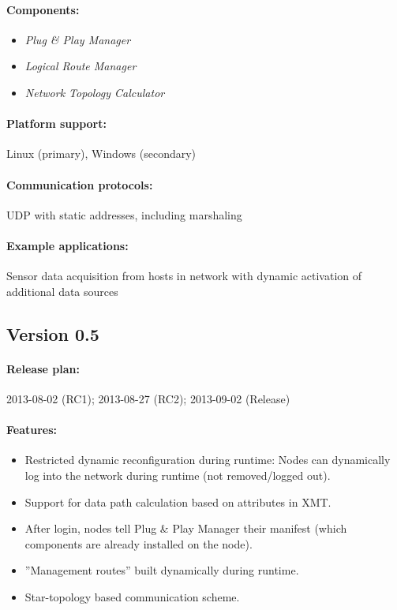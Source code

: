 \paragraph{Components:}
\begin{itemize}
	\item \emph{Plug \& Play Manager}
	\item \emph{Logical Route Manager}
	\item \emph{Network Topology Calculator}
\end{itemize}

\paragraph{Platform support:} Linux (primary), Windows (secondary)
\paragraph{Communication protocols:} UDP with static addresses, including marshaling
\paragraph{Example applications:} Sensor data acquisition from hosts in network with dynamic activation of additional data sources



\subsection{Version 0.5}

\paragraph{Release plan:} 2013-08-02 (RC1); 2013-08-27 (RC2); 2013-09-02 (Release)

\paragraph{Features:}
\begin{itemize}
	\item Restricted dynamic reconfiguration during runtime: Nodes can dynamically log into the network during runtime (not removed/logged out).
	\item Support for data path calculation based on attributes in XMT.
	\item After login, nodes tell Plug \& Play Manager their manifest (which components are already installed on the node).
	\item ''Management routes'' built dynamically during runtime.
	\item Star-topology based communication scheme.
\end{itemize}

